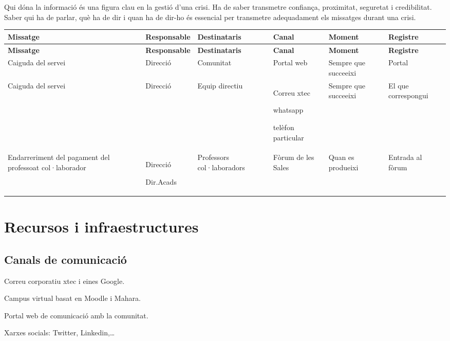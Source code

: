 \documentclass[fontsize=10pt,%
paper=a4,%
DIV=14,%
twoside=semi,%
pagesize=auto,%
parskip=half,
captions=tableheading,%
numbers=noenddot,%
toc=graduated%
]{scrartcl}
\renewcommand{\arraystretch}{1.75}%
\renewcommand{\arraystretch}{1.75}%
\begin{document}
Qui dóna la informació és una figura clau en la gestió d'una crisi. Ha de saber transmetre confiança, proximitat, seguretat i credibilitat. Saber qui ha de parlar, què ha de dir i quan ha de dir-ho és essencial per transmetre adequadament els missatges durant una crisi.



\small{
\setlength{\tabcolsep}{10pt}
\renewcommand{\arraystretch}{1.5}
\begin{longtable}{p{3cm}p{2cm}p{2cm}p{1.5cm}p{2cm}p{1.5cm}}
\hline
\textbf{Missatge}  & \textbf{Responsable} & \textbf{Destinataris} & \textbf{Canal} & \textbf{Moment}      & \textbf{Registre} \\
\hline \endfirsthead
\hline
\textbf{Missatge}  & \textbf{Responsable} & \textbf{Destinataris} & \textbf{Canal} & \textbf{Moment}      & \textbf{Registre} \\
\hline \endhead
Caiguda del servei & Direcció             & Comunitat             & Portal web     & Sempre que succeeixi & Portal            \\
Caiguda del servei & Direcció             & Equip directiu        & Correu xtec

whatsapp

telèfon particular
                   & Sempre que succeeixi & El que correspongui                                                               \\
Endarreriment del pagament del professoat col·laborador & Direcció

Dir.Acads & Professors col·laboradors & Fòrum de les Sales & Quan es produeixi & Entrada al fòrum\\
\end{longtable}
}%


\section{Recursos i infraestructures}\label{sec:recursos}

\subsection{Canals de comunicació}

Correu corporatiu xtec i eines Google.

Campus virtual basat en Moodle i Mahara.

Portal web de comunicació amb la comunitat.

Xarxes socials: Twitter, Linkedin,\dots
\end{document}
